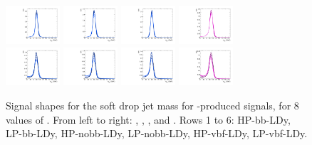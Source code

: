 \begin{figure}[htbp]
  \includegraphics[width=0.18\textwidth]{fig/2Dfit/templateSignalVsMX_fromDC_VBFGbuToWW_MJJ_mu_HP_vbf_LDy.pdf}
  \includegraphics[width=0.18\textwidth]{fig/2Dfit/templateSignalVsMX_fromDC_VBFRadToWW_MJJ_mu_HP_vbf_LDy.pdf}
  \includegraphics[width=0.18\textwidth]{fig/2Dfit/templateSignalVsMX_fromDC_VBFZprToWW_MJJ_mu_HP_vbf_LDy.pdf}
  \includegraphics[width=0.18\textwidth]{fig/2Dfit/templateSignalVsMX_fromDC_VBFWprToWZ_MJJ_mu_HP_vbf_LDy.pdf}\\
  \includegraphics[width=0.18\textwidth]{fig/2Dfit/templateSignalVsMX_fromDC_VBFGbuToWW_MJJ_mu_LP_vbf_LDy.pdf}
  \includegraphics[width=0.18\textwidth]{fig/2Dfit/templateSignalVsMX_fromDC_VBFRadToWW_MJJ_mu_LP_vbf_LDy.pdf}
  \includegraphics[width=0.18\textwidth]{fig/2Dfit/templateSignalVsMX_fromDC_VBFZprToWW_MJJ_mu_LP_vbf_LDy.pdf}
  \includegraphics[width=0.18\textwidth]{fig/2Dfit/templateSignalVsMX_fromDC_VBFWprToWZ_MJJ_mu_LP_vbf_LDy.pdf}\\
  \caption{
    Signal shapes for the soft drop jet mass \MJ for \VBF-produced signals, for 8 values of \MX.
    From left to right: \GBulktoWW, \RadtoWW, \ZprtoWW, and \WprtoWZ.
    Rows 1 to 6: HP-bb-LDy, LP-bb-LDy, HP-nobb-LDy, LP-nobb-LDy, HP-vbf-LDy, LP-vbf-LDy.
  }
  \label{fig:MJJShapes_VBF_LDy_Run2}
\end{figure}

